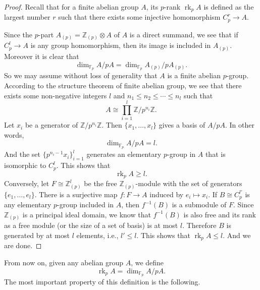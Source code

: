\documentclass{amsart}
\numberwithin{equation}{section}
\theoremstyle{plain}
\theoremstyle{definition}
\theoremstyle{remark}
\begin{document}
\begin{proof}
	Recall that for a finite abelian group $A$, its $p$-rank $\operatorname{rk}_pA$ is defined as the largest number $r$ such that there exists some injective homomorphism $C_p^r\to A$.
	
	Since the $p$-part $A_{(p)}=\mathbb{Z}_{(p)}\otimes A$ of $A$ is a direct summand, we see that if $C_p^{l}\to A$ is any group homomorphism, then its image is included in $A_{(p)}$.
	Moreover it is clear that
	\begin{equation*}
		\dim_{\mathbb{F}_p}A/pA=\dim_{\mathbb{F}_p}A_{(p)}/pA_{(p)}.
	\end{equation*}
	So we may assume without loss of generality that $A$ is a finite abelian $p$-group.
	According to the structure theorem of finite abelian group, we see that there exists some non-negative integers $l$ and $n_1\leq n_2\leq\cdots\leq n_l$ such that
	\begin{equation*}
		A\cong\prod_{i=1}^l\mathbb{Z}/p^{n_i}\mathbb{Z}.
	\end{equation*}
	Let $x_i$ be a generator of $\mathbb{Z}/p^{n_i}\mathbb{Z}$.
	Then $\{x_1,\dots,x_l\}$ gives a basis of $A/pA$.
	In other words,
	\begin{equation*}
		\dim_{\mathbb{F}_p}A/pA=l.
	\end{equation*}
	And the set $\{p^{n_i-1}x_i\}_{i=1}^l$ generates an elementary $p$-group in $A$ that is isomorphic to $C_p^l$.
	This shows that
	\begin{equation*}
		\operatorname{rk}_pA\geq l.
	\end{equation*}
	Conversely, let $F\cong\mathbb{Z}_{(p)}^l$ be the free $\mathbb{Z}_{(p)}$-module with the set of generators $\{e_1,\dots,e_l\}$.
	There is a surjective map $f:F\to A$ induced by $e_i\mapsto x_i$.
	If $B\cong C_p^{l'}$ is any elementary $p$-group included in $A$, then $f^{-1}(B)$ is a submodule of $F$.
	Since $\mathbb{Z}_{(p)}$ is a principal ideal domain, we know that $f^{-1}(B)$ is also free and its rank as a free module (or the size of a set of basis) is at most $l$.
	Therefore $B$ is generated by at most $l$ elements, i.e., $l'\leq l$.
	This shows that $\operatorname{rk}_pA\leq l$.
	And we are done.
\end{proof}
From now on, given any abelian group $A$, we define
\begin{equation*}
	\operatorname{rk}_p A=\dim_{\mathbb{F}_p}A/pA.
\end{equation*}
The most important property of this definition is the following.
\end{document}
